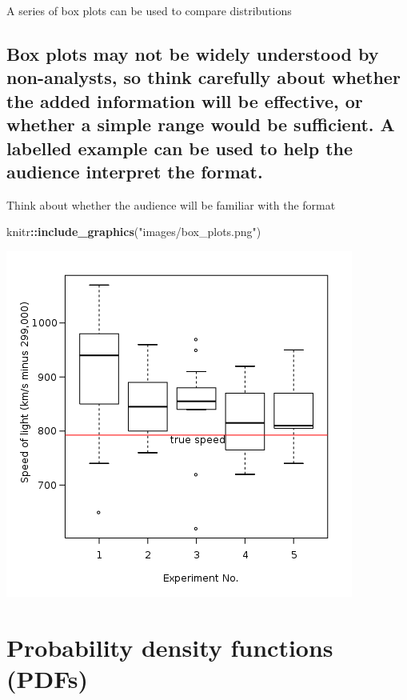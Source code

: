 \documentclass[]{book}
\newenvironment{Shaded}{\begin{snugshade}}{\end{snugshade}}
\newcommand{\KeywordTok}[1]{\textcolor[rgb]{0.13,0.29,0.53}{\textbf{#1}}}
\newcommand{\StringTok}[1]{\textcolor[rgb]{0.31,0.60,0.02}{#1}}
\newcommand{\OperatorTok}[1]{\textcolor[rgb]{0.81,0.36,0.00}{\textbf{#1}}}
\newcommand{\NormalTok}[1]{#1}
\begin{document}
 A series of box plots can be used to compare distributions

\subsection{Box plots may not be widely understood by non-analysts, so
think carefully about whether the added information will be effective,
or whether a simple range would be sufficient. A labelled example can be
used to help the audience interpret the
format.}\label{box-plots-may-not-be-widely-understood-by-non-analysts-so-think-carefully-about-whether-the-added-information-will-be-effective-or-whether-a-simple-range-would-be-sufficient.-a-labelled-example-can-be-used-to-help-the-audience-interpret-the-format.}

 Think about whether the audience will be familiar with the format

\begin{Shaded}
\begin{Highlighting}[]
\NormalTok{knitr}\OperatorTok{::}\KeywordTok{include_graphics}\NormalTok{(}\StringTok{"images/box_plots.png"}\NormalTok{)}
\end{Highlighting}
\end{Shaded}

\begin{center}\includegraphics{images/box_plots} \end{center}

\section{Probability density functions
(PDFs)}\label{probability-density-functions-pdfs}
\end{document}
